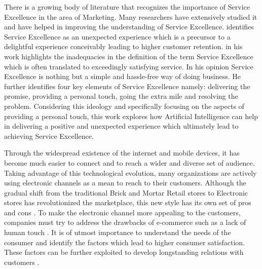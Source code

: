 \noindent
There is a growing body of literature that recognizes the importance of Service Excellence in the area of Marketing. Many researchers have extensively studied it and have helped in improving the understanding of Service Excellence. \textcite[331]{Oliver1997} identifies Service Excellence as an unexpected experience which is a precursor to a delightful experience conceivably leading to higher customer retention.\textcite[130]{Johnston2004} in his work highlights the inadequacies in the definition of the term Service Excellence which is often translated to exceedingly satisfying service. In his opinion Service Excellence is nothing but a simple and hassle-free way of doing business. He further identifies four key elements of Service Excellence namely: delivering the promise, providing a personal touch, going the extra mile and resolving the problem. Considering this ideology and specifically focusing on the aspects of providing a personal touch, this work explores how Artificial Intelligence can help in delivering a positive and unexpected experience which ultimately lead to achieving Service Excellence. \\ \par

\noindent
Through the widespread existence of the internet and mobile devices, it has become much easier to connect and to reach a wider and diverse set of audience. Taking advantage of this technological evolution, many organizations are actively using electronic channels as a mean to reach to their customers. Although the gradual shift from the traditional Brick and Mortar Retail stores to Electronic stores has revolutionized the marketplace, this new style has its own set of pros and cons \autocite[p. 2362 ff.]{Niranjanamurthy2013}. To make the  electronic channel more appealing to the customers, companies must try to address the drawbacks of e-commerce such as a lack of human touch \autocite[1153]{Qiu2006}. It is of utmost importance to understand the needs of the consumer and identify the factors which lead to higher consumer satisfaction. These factors can be further exploited to develop longstanding relations with customers \autocite[284]{Thaichon2014}.  \\ \par

